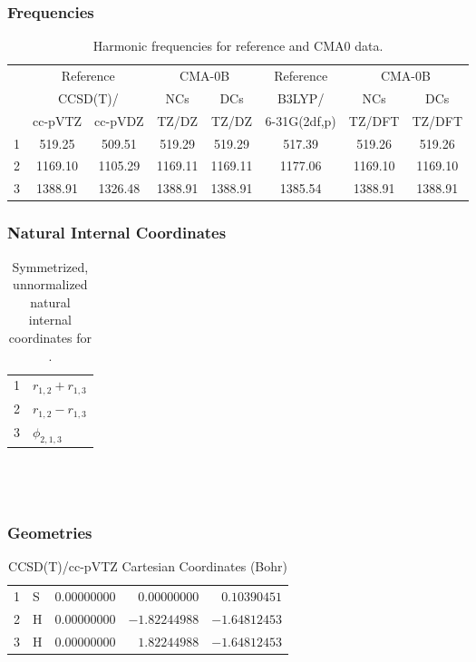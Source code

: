 \documentclass[10pt,oneside]{article}
\begin{document}
\subsubsection*{Frequencies}
\begin{table}[h!]
\centering
\caption{Harmonic frequencies for reference and CMA0 data.}
\begin{tabular}{cccccccc}
\toprule
{} & \multicolumn{2}{c}{Reference} & \multicolumn{2}{c}{CMA-0B} &    Reference & \multicolumn{2}{c}{CMA-0B} \\
{} & \multicolumn{2}{c}{CCSD(T)/} &     NCs &     DCs &       B3LYP/ &     NCs &     DCs \\
{} &   cc-pVTZ & cc-pVDZ &   TZ/DZ &   TZ/DZ & 6-31G(2df,p) &  TZ/DFT &  TZ/DFT \\
\midrule
1 &    519.25 &  509.51 &  519.29 &  519.29 &       517.39 &  519.26 &  519.26 \\
2 &   1169.10 & 1105.29 & 1169.11 & 1169.11 &      1177.06 & 1169.10 & 1169.10 \\
3 &   1388.91 & 1326.48 & 1388.91 & 1388.91 &      1385.54 & 1388.91 & 1388.91 \\
\bottomrule
\end{tabular}
\end{table}

\clearpage

\subsubsection*{Natural Internal Coordinates}
\begin{table}[h!]
\centering
\caption{Symmetrized, unnormalized natural internal coordinates for .}
\small
\begin{tabular}{ll}
  1   & $r_{1,2} + r_{1,3}$ \\
  2   & $r_{1,2} - r_{1,3}$ \\
  3   & $\phi_{2,1,3}$ \\
\end{tabular}
\end{table}

\clearpage

\subsection{\ \ \ }

\subsubsection*{Geometries}
\begin{table}[h!]
\centering
\caption{CCSD(T)/cc-pVTZ Cartesian Coordinates (Bohr)}
\begin{tabular}{llrrr}
1  & S  & $ 0.00000000$ & $ 0.00000000$ & $ 0.10390451$ \\
2  & H  & $ 0.00000000$ & $-1.82244988$ & $-1.64812453$ \\
3  & H  & $ 0.00000000$ & $ 1.82244988$ & $-1.64812453$ \\
\end{tabular}
\end{table}
\end{document}

